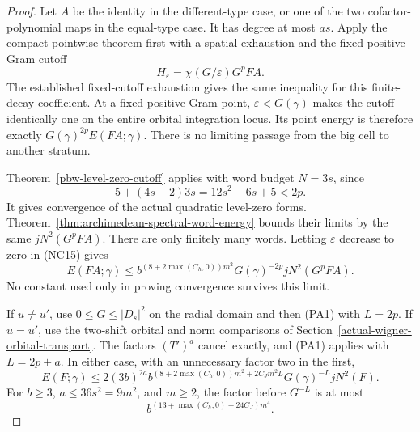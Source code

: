 \begin{proof}
Let \(A\) be the identity in the different-type case, or one
of the two cofactor-polynomial maps in the equal-type case.
It has degree at most \(as\). Apply the compact pointwise
theorem first with a spatial exhaustion and the fixed positive
Gram cutoff
\[
                 H_\varepsilon=\chi(G/\varepsilon)G^pFA.
\]
The established fixed-cutoff exhaustion gives the same inequality
for this finite-decay coefficient. At a fixed positive-Gram point,
\(\varepsilon<G(\gamma)\) makes the cutoff identically one
on the entire orbital integration locus. Its point energy is
therefore exactly \(G(\gamma)^{2p}E(FA;\gamma)\).
There is no limiting passage from the big cell to another stratum.

Theorem~\ref{pbw-level-zero-cutoff} applies with word budget
\(N=3s\), since
\[
             5+(4s-2)3s=12s^2-6s+5<2p .
\]
It gives convergence of the actual quadratic level-zero forms.
Theorem~\ref{thm:archimedean-spectral-word-energy} bounds their
limits by the same \(jN^2(G^pFA)\). There are only finitely
many words. Letting \(\varepsilon\) decrease to zero in
(NC15) gives
\[
 E(FA;\gamma)
 \le b^{(8+2\max(C_h,0))m^2}G(\gamma)^{-2p}
                                      jN^2(G^pFA).     \tag{PA7}
\]
No constant used only in proving convergence survives this limit.

If \(u\ne u'\), use \(0\le G\le|D_s|^2\) on the radial
domain and then (PA1) with \(L=2p\).
If \(u=u'\), use the two-shift orbital and norm comparisons
of Section~\ref{actual-wigner-orbital-transport}. The factors
\((T')^a\) cancel exactly, and (PA1) applies with \(L=2p+a\).
In either case, with an unnecessary factor two in the first,
\[
 E(F;\gamma)
 \le 2(3b)^{2a}b^{(8+2\max(C_h,0))m^2+2C_Jm^2L}
                   G(\gamma)^{-L}jN^2(F).              \tag{PA8}
\]
For \(b\ge3\), \(a\le36s^2=9m^2\), and \(m\ge2\),
the factor before \(G^{-L}\) is at most
\[
                   b^{(13+\max(C_h,0)+24C_J)m^4}.
                                                        \tag{PA9}
\]


\end{proof}
